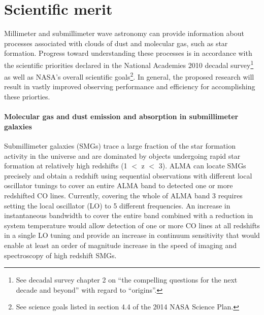 

\section{Scientific merit}
Millimeter and submillimeter wave astronomy can provide information about processes associated with clouds of dust and molecular gas, such as star formation. Progress toward understanding these processes is in accordance with the scientific priorities declared in the National Academies 2010 decadal survey\footnote{See decadal survey chapter 2 on ``the compelling questions for the next decade and beyond'' with regard to ``origins''.} as well as NASA’s overall scientific goals\footnote{See science goals listed in section 4.4 of the 2014 NASA Science Plan.}. In general, the proposed research will result in vastly improved observing performance and efficiency for accomplishing these priorties. 

\paragraph*{Molecular gas and dust emission and absorption in submillimeter galaxies}
Submillimeter galaxies (SMGs) trace a large fraction of the star formation activity in the universe and are dominated by objects undergoing rapid star formation at relatively high redshifts (1 $<$ z $<$ 3). ALMA can locate SMGs precisely and obtain a redshift using sequential observations with different local oscillator tunings to cover an entire ALMA band to detected one or more redshifted CO lines. Currently, covering the whole of ALMA band 3 requires setting the local oscillator (LO) to 5 different frequencies. An increase in instantaneous bandwidth to cover the entire band combined with a reduction in system temperature would allow detection of one or more CO lines at all redshifts in a single LO tuning and provide an increase in continuum sensitivity that would enable at least an order of magnitude increase in the speed of imaging and spectroscopy of high redshift SMGs.

